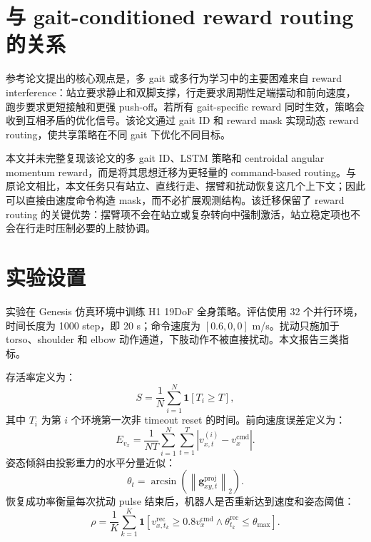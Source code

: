 \documentclass{article}
\newcommand{\ind}{\mathbf{1}}
\begin{document}
\section{与 gait-conditioned reward routing 的关系}

参考论文提出的核心观点是，多 gait 或多行为学习中的主要困难来自 reward interference：站立要求静止和双脚支撑，行走要求周期性足端摆动和前向速度，跑步要求更短接触和更强 push-off。若所有 gait-specific reward 同时生效，策略会收到互相矛盾的优化信号。该论文通过 gait ID 和 reward mask 实现动态 reward routing，使共享策略在不同 gait 下优化不同目标。

本文并未完整复现该论文的多 gait ID、LSTM 策略和 centroidal angular momentum reward，而是将其思想迁移为更轻量的 command-based routing。与原论文相比，本文任务只有站立、直线行走、摆臂和扰动恢复这几个上下文；因此可以直接由速度命令构造 mask，而不必扩展观测结构。该迁移保留了 reward routing 的关键优势：摆臂项不会在站立或复杂转向中强制激活，站立稳定项也不会在行走时压制必要的上肢协调。

\section{实验设置}

实验在 Genesis 仿真环境中训练 H1 19DoF 全身策略。评估使用 32 个并行环境，时间长度为 1000 step，即 20 s；命令速度为 $[0.6,0,0]$ m/s。扰动只施加于 torso、shoulder 和 elbow 动作通道，下肢动作不被直接扰动。本文报告三类指标。

存活率定义为：
\begin{equation}
S=\frac{1}{N}\sum_{i=1}^{N}\ind[T_i\ge T],
\end{equation}
其中 $T_i$ 为第 $i$ 个环境第一次非 timeout reset 的时间。前向速度误差定义为：
\begin{equation}
E_{v_x}=
\frac{1}{NT}
\sum_{i=1}^{N}\sum_{t=1}^{T}
\left|v_{x,t}^{(i)}-v_x^{\mathrm{cmd}}\right|.
\end{equation}
姿态倾斜由投影重力的水平分量近似：
\begin{equation}
\theta_t=
\arcsin\left(
\left\|\mathbf{g}_{xy,t}^{\mathrm{proj}}\right\|_2
\right).
\end{equation}
恢复成功率衡量每次扰动 pulse 结束后，机器人是否重新达到速度和姿态阈值：
\begin{equation}
\rho=
\frac{1}{K}
\sum_{k=1}^{K}
\ind
\left[
v_{x,t_k}^{\mathrm{rec}}\ge 0.8 v_x^{\mathrm{cmd}}
\land
\theta_{t_k}^{\mathrm{rec}}\le \theta_{\max}
\right].
\end{equation}
\end{document}

